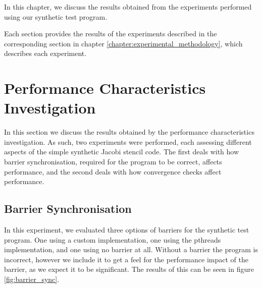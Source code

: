 
In this chapter, we discuss the results obtained from the experiments performed using our synthetic test program.

Each section provides the results of the experiments described in the corresponding section in chapter \ref{chapter:experimental_methodology}, which describes each experiment.



\section{Performance Characteristics Investigation}
\label{section:results:performance_characteristics_investigation}

In this section we discuss the results obtained by the performance characteristics investigation. As such, two experiments were performed, each assessing different aspects of the simple synthetic Jacobi stencil code. The first deals with how barrier synchronisation, required for the program to be correct, affects performance, and the second deals with how convergence checks affect performance.



\subsection{Barrier Synchronisation}
\label{section:results:barrier_syncronisation}

In this experiment, we evaluated three options of barriers for the synthetic test program. One using a custom implementation, one using the pthreads implementation, and one using no barrier at all. Without a barrier the program is incorrect, however we include it to get a feel for the performance impact of the barrier, as we expect it to be significant. The results of this can be seen in figure \ref{fig:barrier_sync}.



